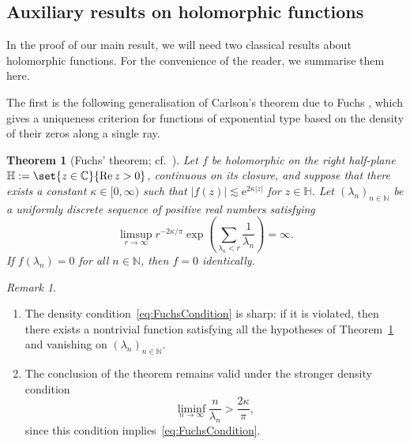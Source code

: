 \documentclass{article}
\renewcommand{\Re}{\operatorname{Re}}
\newtheorem{theorem}{Theorem}
\theoremstyle{remark}
\newtheorem{remark}{Remark}
\begin{document}
    \subsection{Auxiliary results on holomorphic functions}
    
    In the proof of our main result, we will need two classical results about holomorphic functions. For the convenience of the reader, we summarise them here. 

    The first is the following generalisation of Carlson's theorem due to Fuchs \cite{Fuchs1946Generalization}, which gives a uniqueness criterion for functions of exponential type based on the density of their zeros along a single ray. 

    \begin{theorem}[{Fuchs' theorem; cf.~\cite[Section~9.5 on pp.~157--158]{Boas1954Entire}}]\label{thm:Fuchs}
        Let $f$ be holomorphic on the right half-plane $\mathbb H := \set{ z \in \mathbb C }{ \Re z > 0 }$, continuous on its closure, and suppose that there exists a constant $\kappa \in [0,\infty)$ such that $|f(z)| \lesssim \mathrm{e}^{2 \kappa |z|}$ for $z \in \mathbb H$.
        Let $(\lambda_n)_{n\in\mathbb N}$ be a uniformly discrete sequence of positive real numbers satisfying
        \begin{equation}\label{eq:FuchsCondition}
            \limsup_{r \to \infty} r^{-2\kappa/\pi} \exp\left( \sum_{\lambda_n < r} \frac{1}{\lambda_n} \right) = \infty.
        \end{equation}
        If $f(\lambda_n)=0$ for all $n\in\mathbb N$, then $f = 0$ identically.
    \end{theorem}

    \begin{remark}
    \label{rem:FuchsSharp}
        \begin{enumerate}
            \item The density condition~\eqref{eq:FuchsCondition} is sharp: if it is violated, then there exists a nontrivial function satisfying all the hypotheses of Theorem~\ref{thm:Fuchs} and vanishing on $(\lambda_n)_{n\in\mathbb N}$.

            \item The conclusion of the theorem remains valid under the stronger density condition
            \[
                \liminf_{n \to \infty} \frac{n}{\lambda_n} > \frac{2\kappa}{\pi},
            \]
            since this condition implies~\eqref{eq:FuchsCondition}.
        \end{enumerate}
    \end{remark}
\end{document}
